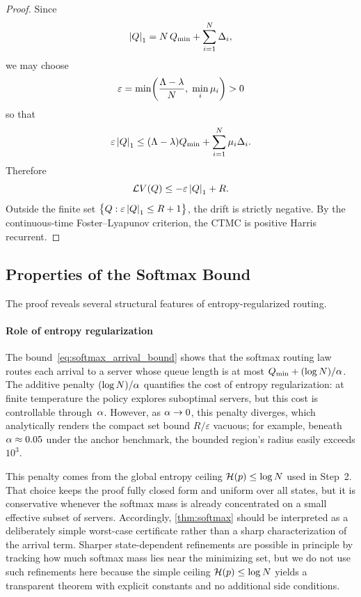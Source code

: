 \begin{proof}
Since
\begin{equation}
\label{eq:l1_decomp}
\left\lvert Q \right\rvert_1 = N\, Q_{\min} + \sum_{i=1}^{N} \Delta_i,
\end{equation}
we may choose
\begin{equation}
\label{eq:softmax_epsilon}
\varepsilon = \min\!\left(\frac{\Lambda - \lambda}{N},\; \min_i \mu_i\right) > 0
\end{equation}
so that
\begin{equation}
\label{eq:softmax_eps_bound}
\varepsilon \left\lvert Q \right\rvert_1 \leq (\Lambda - \lambda)Q_{\min} + \sum_{i=1}^{N} \mu_i \Delta_i.
\end{equation}
Therefore
\begin{equation}
\label{eq:softmax_final_drift}
\mathcal{L} V(Q) \leq -\varepsilon \left\lvert Q \right\rvert_1 + R.
\end{equation}
Outside the finite set $\bigl\{Q : \varepsilon \left\lvert Q \right\rvert_1 \leq R + 1\bigr\}$, the drift is strictly negative. By the continuous-time Foster--Lyapunov criterion, the CTMC is positive Harris recurrent.
\end{proof}

\subsection{Properties of the Softmax Bound}
\label{sec:softmax:discussion}

The proof reveals several structural features of entropy-regularized routing.

\paragraph{Role of entropy regularization}
The bound~\eqref{eq:softmax_arrival_bound} shows that the softmax routing law routes each arrival to a server whose queue length is at most $Q_{\min} + (\log N)/\alpha$. The additive penalty $(\log N)/\alpha$ quantifies the cost of entropy regularization: at finite temperature the policy explores suboptimal servers, but this cost is controllable through~$\alpha$. However, as $\alpha \to 0$, this penalty diverges, which analytically renders the compact set bound $R/\varepsilon$ vacuous; for example, beneath $\alpha \approx 0.05$ under the anchor benchmark, the bounded region's radius easily exceeds $10^3$.

This penalty comes from the global entropy ceiling $\mathcal{H}(p)\le \log N$ used in Step~2. That choice keeps the proof fully closed form and uniform over all states, but it is conservative whenever the softmax mass is already concentrated on a small effective subset of servers. Accordingly, \cref{thm:softmax} should be interpreted as a deliberately simple worst-case certificate rather than a sharp characterization of the arrival term.
Sharper state-dependent refinements are possible in principle by tracking how much softmax mass lies near the minimizing set, but we do not use such refinements here because the simple ceiling $\mathcal{H}(p)\le \log N$ yields a transparent theorem with explicit constants and no additional side conditions.

